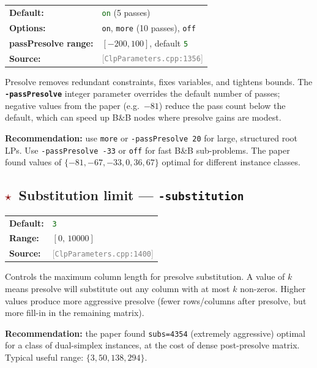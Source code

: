 \documentclass[11pt,a4paper]{article}
\newcommand{\param}[1]{\texttt{\textbf{#1}}}
\newcommand{\val}[1]{\texttt{#1}}
\newcommand{\src}[1]{\textcolor{gray}{\small[\texttt{#1}]}}
\newcommand{\default}[1]{\textcolor{darkgreen}{\texttt{#1}}}
\newcommand{\important}{\textcolor{darkred}{\textbf{$\star$}}}
\begin{document}
\begin{tabular}{@{}ll@{}}
  \textbf{Default:} & \default{on} (5 passes) \\
  \textbf{Options:} & \val{on}, \val{more} (10 passes), \val{off} \\
  \textbf{passPresolve range:} & $[-200, 100]$, default \default{5} \\
  \textbf{Source:}  & \src{ClpParameters.cpp:1356}
\end{tabular}

\medskip
Presolve removes redundant constraints, fixes variables, and tightens bounds.
The \param{-passPresolve} integer parameter overrides the default number of passes;
negative values from the paper (e.g.\ $-81$) reduce the pass count below the default,
which can speed up B\&B nodes where presolve gains are modest.

\begin{tipbox}
  \textbf{Recommendation:} use \val{more} or \val{-passPresolve 20} for large,
  structured root LPs. Use \val{-passPresolve -33} or \val{off} for fast B\&B
  sub-problems. The paper found values of $\{-81, -67, -33, 0, 36, 67\}$ optimal
  for different instance classes.
\end{tipbox}

\subsection{\important\ Substitution limit --- \param{-substitution}}

\begin{tabular}{@{}ll@{}}
  \textbf{Default:} & \default{3} \\
  \textbf{Range:}   & $[0,\,10000]$ \\
  \textbf{Source:}  & \src{ClpParameters.cpp:1400}
\end{tabular}

\medskip
Controls the maximum column length for presolve substitution. A value of $k$ means
presolve will substitute out any column with at most $k$ non-zeros. Higher values
produce more aggressive presolve (fewer rows/columns after presolve, but more
fill-in in the remaining matrix).

\begin{tipbox}
  \textbf{Recommendation:} the paper found \val{subs=4354} (extremely aggressive)
  optimal for a class of dual-simplex instances, at the cost of dense post-presolve
  matrix. Typical useful range: $\{3, 50, 138, 294\}$.
\end{tipbox}
\end{document}
